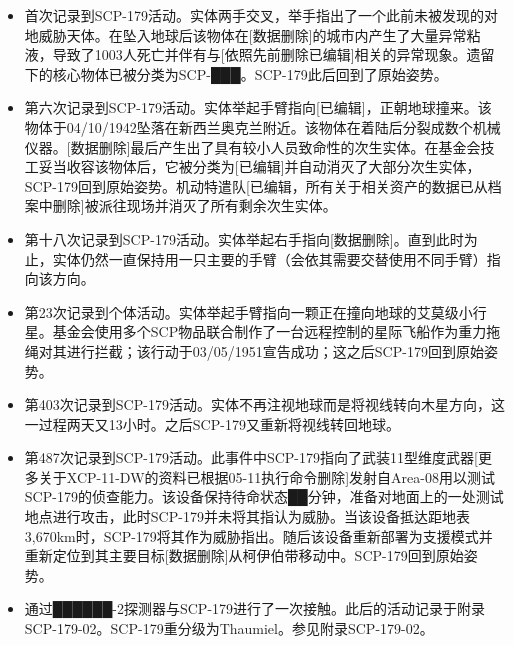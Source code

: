 
\begin{itemize}
\item {} 首次记录到SCP-179活动。实体两手交叉，举手指出了一个此前未被发现的对地威胁天体。在坠入地球后该物体在{[}数据删除]的城市内产生了大量异常粘液，导致了1003人死亡并伴有与{[}依照先前删除已编辑]相关的异常现象。遗留下的核心物体已被分类为SCP-███。SCP-179此后回到了原始姿势。
\item {} 第六次记录到SCP-179活动。实体举起手臂指向{[}已编辑]，正朝地球撞来。该物体于04\slash 10\slash 1942坠落在新西兰奥克兰附近。该物体在着陆后分裂成数个机械仪器。{[}数据删除]最后产生出了具有较小人员致命性的次生实体。在基金会技工妥当收容该物体后，它被分类为{[}已编辑]并自动消灭了大部分次生实体，SCP-179回到原始姿势。机动特遣队{[}已编辑，所有关于相关资产的数据已从档案中删除]被派往现场并消灭了所有剩余次生实体。
\item {} 第十八次记录到SCP-179活动。实体举起右手指向{[}数据删除]。直到此时为止，实体仍然一直保持用一只主要的手臂（会依其需要交替使用不同手臂）指向该方向。
\item {} 第23次记录到个体活动。实体举起手臂指向一颗正在撞向地球的艾莫级小行星。基金会使用多个SCP物品联合制作了一台远程控制的星际飞船作为重力拖绳对其进行拦截；该行动于03\slash 05\slash 1951宣告成功；这之后SCP-179回到原始姿势。
\item {} 第403次记录到SCP-179活动。实体不再注视地球而是将视线转向木星方向，这一过程两天又13小时。之后SCP-179又重新将视线转回地球。
\item {} 第487次记录到SCP-179活动。此事件中SCP-179指向了武装11型维度武器{[}更多关于XCP-11-DW的资料已根据05-11执行命令删除]发射自Area-08用以测试SCP-179的侦查能力。该设备保持待命状态██分钟，准备对地面上的一处测试地点进行攻击，此时SCP-179并未将其指认为威胁。当该设备抵达距地表3,670km时，SCP-179将其作为威胁指出。随后该设备重新部署为支援模式并重新定位到其主要目标{[}数据删除]从柯伊伯带移动中。SCP-179回到原始姿势。
\item {} 通过██████-2探测器与SCP-179进行了一次接触。此后的活动记录于附录SCP-179-02。SCP-179重分级为Thaumiel。参见附录SCP-179-02。
\end{itemize}


